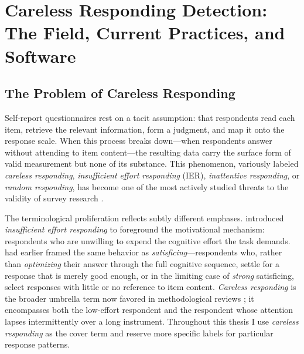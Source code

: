 \chapter[Careless Responding Detection]{Careless Responding Detection: The Field, Current Practices, and Software}
\label{ch:intro}

\section{The Problem of Careless Responding}

Self-report questionnaires rest on a tacit assumption: that respondents read
each item, retrieve the relevant information, form a judgment, and map it onto
the response scale. When this process breaks down---when respondents answer
without attending to item content---the resulting data carry the surface form
of valid measurement but none of its substance. This phenomenon, variously
labeled \emph{careless responding}, \emph{insufficient effort responding}
(IER), \emph{inattentive responding}, or \emph{random responding}, has become
one of the most actively studied threats to the validity of survey research
\parencite{meade2012identifying, curran2016methods, ward2023dealing}.

The terminological proliferation reflects subtly different emphases.
\textcite{huang2012detecting} introduced \emph{insufficient effort responding}
to foreground the motivational mechanism: respondents who are unwilling to
expend the cognitive effort the task demands. \textcite{krosnick1991response}
had earlier framed the same behavior as \emph{satisficing}---respondents who,
rather than \emph{optimizing} their answer through the full cognitive sequence,
settle for a response that is merely good enough, or in the limiting case of
\emph{strong} satisficing, select responses with little or no reference to item
content. \emph{Careless responding} is the broader umbrella term now favored in
methodological reviews \parencite{ward2023dealing}; it encompasses both the
low-effort respondent and the respondent whose attention lapses intermittently
over a long instrument. Throughout this thesis I use \emph{careless responding}
as the cover term and reserve more specific labels for particular response
patterns.

